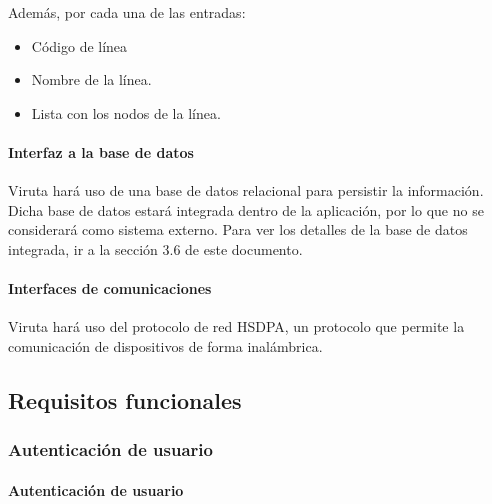 Además, por cada una de las entradas:

 \begin{itemize}
 \item Código de línea
 \item Nombre de la línea.
 \item Lista con los nodos de la línea.
 \end{itemize}

\paragraph{Interfaz a la base de datos}

Viruta hará uso de una base de datos relacional para persistir la información. Dicha base de datos estará integrada dentro de la aplicación, por lo que no se considerará como sistema externo. Para ver los detalles de la base de datos integrada, ir a la sección 3.6 de este documento.

\paragraph{Interfaces de comunicaciones}

Viruta hará uso del protocolo de red HSDPA, un protocolo que permite la comunicación  de dispositivos de forma inalámbrica.

\subsection{Requisitos funcionales}

\subsubsection{Autenticación de usuario}

\paragraph{Autenticación de usuario}

